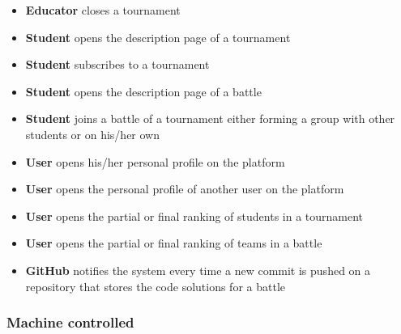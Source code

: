 \begin{itemize}
		\item \textbf{Educator} closes a tournament
		\item \textbf{Student} opens the description page of a tournament
		\item \textbf{Student} subscribes to a tournament
		\item \textbf{Student} opens the description page of a battle
		\item \textbf{Student} joins a battle of a tournament either forming a group with other students or on his/her own
		\item \textbf{User} opens his/her personal profile on the platform
		\item \textbf{User} opens the personal profile of another user on the platform
		\item \textbf{User} opens the partial or final ranking of students in a tournament
		\item \textbf{User} opens the partial or final ranking of teams in a battle
		\item \textbf{GitHub} notifies the system every time a new commit is pushed on a repository that stores the code solutions for a battle
		
	\end{itemize}
	
	\subsubsection{Machine controlled}
	
